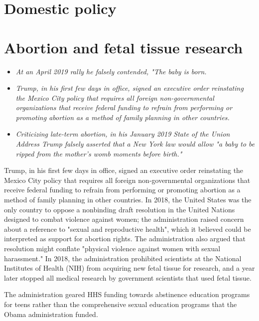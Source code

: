 \section{Domestic policy}\label{domestic-policy}

\section{Abortion and fetal tissue
research}\label{abortion-and-fetal-tissue-research}

\begin{itemize}
\item
  \emph{At an April 2019 rally he falsely contended, "The baby is born.}
\item
  \emph{Trump, in his first few days in office, signed an executive
  order reinstating the Mexico City policy that requires all foreign
  non-governmental organizations that receive federal funding to refrain
  from performing or promoting abortion as a method of family planning
  in other countries.}
\item
  \emph{Criticizing late-term abortion, in his January 2019 State of the
  Union Address Trump falsely asserted that a New York law would allow
  "a baby to be ripped from the mother's womb moments before birth."}
\end{itemize}

Trump, in his first few days in office, signed an executive order
reinstating the Mexico City policy that requires all foreign
non-governmental organizations that receive federal funding to refrain
from performing or promoting abortion as a method of family planning in
other countries. In 2018, the United States was the only country to
oppose a nonbinding draft resolution in the United Nations designed to
combat violence against women; the administration raised concern about a
reference to "sexual and reproductive health", which it believed could
be interpreted as support for abortion rights. The administration also
argued that resolution might conflate "physical violence against women
with sexual harassment." In 2018, the administration prohibited
scientists at the National Institutes of Health (NIH) from acquiring new
fetal tissue for research, and a year later stopped all medical research
by government scientists that used fetal tissue.

The administration geared HHS funding towards abstinence education
programs for teens rather than the comprehensive sexual education
programs that the Obama administration funded.

